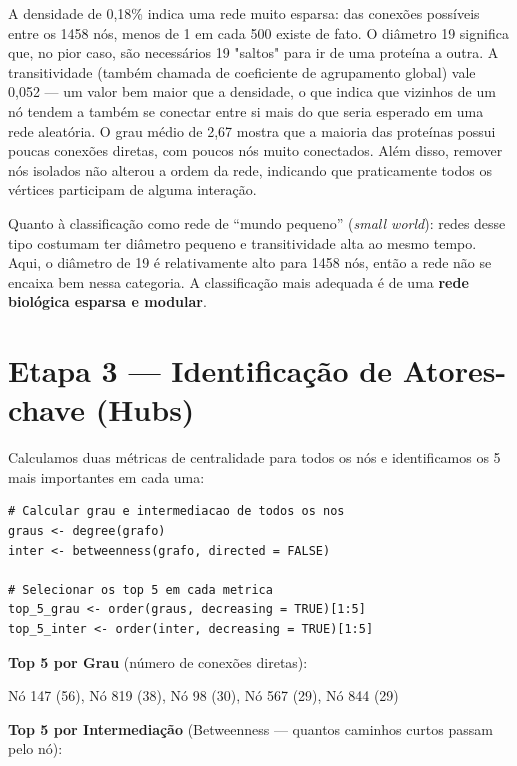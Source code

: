 \documentclass[12pt,a4paper]{article}
\begin{document}
A densidade de 0,18\% indica uma rede muito esparsa: das conexões possíveis entre os 1458 nós, menos de 1 em cada 500 existe de fato. O diâmetro 19 significa que, no pior caso, são necessários 19 "saltos" para ir de uma proteína a outra. A transitividade (também chamada de coeficiente de agrupamento global) vale 0,052 — um valor bem maior que a densidade, o que indica que vizinhos de um nó tendem a também se conectar entre si mais do que seria esperado em uma rede aleatória. O grau médio de 2,67 mostra que a maioria das proteínas possui poucas conexões diretas, com poucos nós muito conectados. Além disso, remover nós isolados não alterou a ordem da rede, indicando que praticamente todos os vértices participam de alguma interação.

Quanto à classificação como rede de ``mundo pequeno'' (\textit{small world}): redes desse tipo costumam ter diâmetro pequeno e transitividade alta ao mesmo tempo. Aqui, o diâmetro de 19 é relativamente alto para 1458 nós, então a rede não se encaixa bem nessa categoria. A classificação mais adequada é de uma \textbf{rede biológica esparsa e modular}.

\section{Etapa 3 — Identificação de Atores-chave (Hubs)}

Calculamos duas métricas de centralidade para todos os nós e identificamos os 5 mais importantes em cada uma:

\begin{lstlisting}
# Calcular grau e intermediacao de todos os nos
graus <- degree(grafo)
inter <- betweenness(grafo, directed = FALSE)

# Selecionar os top 5 em cada metrica
top_5_grau <- order(graus, decreasing = TRUE)[1:5]
top_5_inter <- order(inter, decreasing = TRUE)[1:5]
\end{lstlisting}

\textbf{Top 5 por Grau} (número de conexões diretas):

\begin{center}
Nó 147 (56), Nó 819 (38), Nó 98 (30), Nó 567 (29), Nó 844 (29)
\end{center}

\textbf{Top 5 por Intermediação} (Betweenness — quantos caminhos curtos passam pelo nó):
\end{document}
